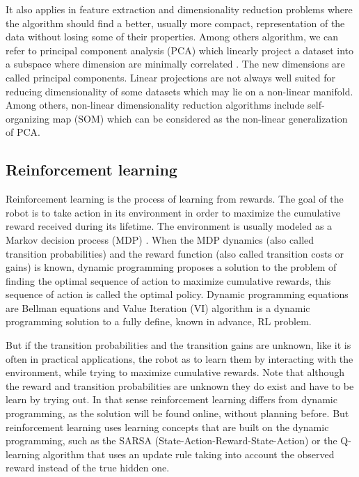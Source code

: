 It also applies in feature extraction and dimensionality reduction problems where the algorithm should find a better, usually more compact, representation of the data without losing some of their properties. Among others algorithm, we can refer to principal component analysis (PCA) which linearly project a dataset into a subspace where dimension are minimally correlated \cite{jolliffe2005principal}. The new dimensions are called principal components. Linear projections are not always well suited for reducing dimensionality of some datasets which may lie on a non-linear manifold. Among others, non-linear dimensionality reduction algorithms include self-organizing map (SOM) \cite{kohonen2001self} which can be considered as the non-linear generalization of PCA.

\subsection{Reinforcement learning}

Reinforcement learning is the process of learning from rewards. The goal of the robot is to take action in its environment in order to maximize the cumulative reward received during its lifetime. The environment is usually modeled as a Markov decision process (MDP) \cite{sutton1998reinforcement}. When the MDP dynamics (also called transition probabilities) and the reward function (also called transition costs or gains) is known, dynamic programming proposes a solution to the problem of finding the optimal sequence of action to maximize cumulative rewards, this sequence of action is called the optimal policy. Dynamic programming equations are Bellman equations \cite{bellman1956dynamic} and Value Iteration (VI) algorithm \cite{sutton1998reinforcement} is a dynamic programming solution to a fully define, known in advance, RL problem.

But if the transition probabilities and the transition gains are unknown, like it is often in practical applications, the robot as to learn them by interacting with the environment, while trying to maximize cumulative rewards. Note that although the reward and transition probabilities are unknown they do exist and have to be learn by trying out. In that sense reinforcement learning differs from dynamic programming, as the solution will be found online, without planning before. But reinforcement learning uses learning concepts that are built on the dynamic programming, such as the SARSA (State-Action-Reward-State-Action) or the Q-learning algorithm \cite{rummery1994line,sutton1998reinforcement} that uses an update rule taking into account the observed reward instead of the true hidden one.

